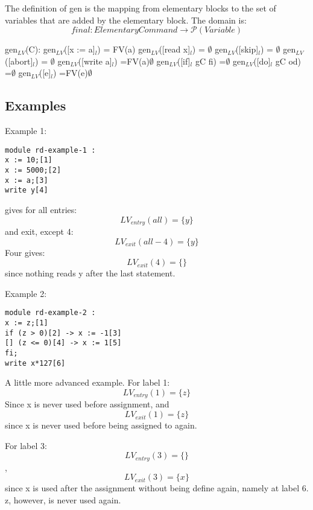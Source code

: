 The definition of gen is the mapping from elementary blocks to the set of variables
that are added by the elementary block. The domain is:
\[final \colon Elementary Command \to \mathcal{P}(Variable)\]

gen$_{LV}$(C):\newline
gen$_{LV}$([x := a]$_l$)           = FV(a)\newline
gen$_{LV}$([read x]$_l$)           = $\emptyset$\newline
gen$_{LV}$([skip]$_l$)             = $\emptyset$\newline
gen$_{LV}$([abort]$_l$) 		   = $\emptyset$\newline
gen$_{LV}$([write a]$_l$)          =FV(a)$\emptyset$\newline
gen$_{LV}$([if]$_l$ gC fi)         =$\emptyset$\newline
gen$_{LV}$([do]$_l$ gC od)         =$\emptyset$\newline
gen$_{LV}$([e]$_l$)                =FV(e)$\emptyset$\newline

\subsection{Examples}

Example 1:
\begin{lstlisting}
module rd-example-1 :
x := 10;[1]
x := 5000;[2]
x := a;[3]
write y[4]
\end{lstlisting}
gives for all entries:
\[LV_{entry}(all) = \{y\}\]
and exit, except 4:
\[LV_{exit}(all-4) = \{y\}\]
Four gives:
\[LV_{exit}(4) = \{\}\]
since nothing reads y after the last statement.

Example 2:
\begin{lstlisting}
module rd-example-2 :
x := z;[1]
if (z > 0)[2] -> x := -1[3]
[] (z <= 0)[4] -> x := 1[5]
fi;
write x*127[6]
\end{lstlisting}
A little more advanced example.
For label 1:
\[LV_{entry}(1) = \{z\}\]
Since x is never used before assignment, and
\[LV_{exit}(1) = \{z\}\]
since x is never used before being assigned to again.

For label 3:
\[LV_{entry}(3) = \{\}\],
\[LV_{exit}(3) = \{x\}\]
since x is used after the assignment without being define again,
namely at label 6. z, however, is never used again.

